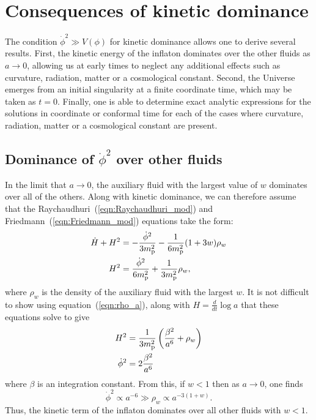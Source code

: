 \section{Consequences of kinetic dominance}
\label{sec:consequences_of_kinetic_dominance}

The condition $\dot\phi^2\gg V(\phi)$ for kinetic dominance allows one to derive several results. First, the kinetic energy of the inflaton dominates over the other fluids as $a\to 0$, allowing us at early times to neglect any additional effects such as curvature, radiation, matter or a cosmological constant. Second, the Universe emerges from an initial singularity at a finite coordinate time, which may be taken as $t=0$. Finally, one is able to determine exact analytic expressions for the solutions in coordinate or conformal time for each of the cases where curvature, radiation, matter or a cosmological constant are present.


\subsection{Dominance of $\dot{\phi}^2$ over other fluids}
\label{sec:dominance_fluids}
In the limit that $a\to 0$, the auxiliary fluid with the largest value of $w$ dominates over all of the others. Along with kinetic dominance, we can therefore assume that the Raychaudhuri~(\ref{eqn:Raychaudhuri_mod}) and Friedmann~(\ref{eqn:Friedmann_mod}) equations take the form:
%
\begin{align}
  \dot{H}+H^2 
  &= 
  -\frac{\dot{\phi}^2}{3m_{\mathrm{p}}^2} - \frac{1}{6m_{\mathrm{p}}^2}(1+3w)\rho_w
  \label{eqn:Ray_KD_eq_rho}
  \\
  H^2 
  &= 
  \frac{\dot{\phi}^2}{6m_{\mathrm{p}}^2} +  \frac{1}{3m_{\mathrm{p}}^2}\rho_w,
  \label{eqn:Friedmann_KD_eq_rho}
\end{align}
where $\rho_w$ is the density of the auxiliary fluid with the largest $w$.  It is not difficult to show using equation~(\ref{eqn:rho_a}),
along with $H=\frac{d}{dt}\log a$ that these equations solve to give
%
\begin{align}
  H^2 
  &= 
  \frac{1}{3m_{\mathrm{p}}^2}\left(\frac{\beta^2}{a^6} + \rho_w\right) 
  \label{eqn:H_of_a_1}
  \\
  \dot{\phi}^2 
  &= 
  2\frac{\beta^2}{a^6} 
  \label{eqn:dotphi_of_a_1}
\end{align}
%
where $\beta$ is an integration constant. From this, if $w<1$ then as
$a\to 0$, one finds
%
\begin{equation}
  \dot{\phi}^2 \propto a^{-6} 
  \gg
  \rho_w \propto a^{-3(1+w)}.
  \label{eqn:dotphidom}
\end{equation}
%
Thus, the kinetic term of the inflaton dominates over all other fluids with $w<1$.




